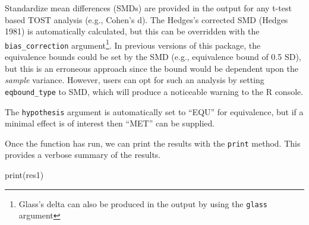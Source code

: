 \documentclass[
]{interact}
\newenvironment{Shaded}{\begin{snugshade}}{\end{snugshade}}
\newcommand{\AttributeTok}[1]{\textcolor[rgb]{0.40,0.45,0.13}{#1}}
\newcommand{\CommentTok}[1]{\textcolor[rgb]{0.37,0.37,0.37}{#1}}
\newcommand{\DecValTok}[1]{\textcolor[rgb]{0.68,0.00,0.00}{#1}}
\newcommand{\FunctionTok}[1]{\textcolor[rgb]{0.28,0.35,0.67}{#1}}
\newcommand{\NormalTok}[1]{\textcolor[rgb]{0.00,0.23,0.31}{#1}}
\newcommand{\OtherTok}[1]{\textcolor[rgb]{0.00,0.23,0.31}{#1}}
\newcommand{\SpecialCharTok}[1]{\textcolor[rgb]{0.37,0.37,0.37}{#1}}
\newcommand{\StringTok}[1]{\textcolor[rgb]{0.13,0.47,0.30}{#1}}
\begin{document}
Standardize mean differences (SMDs) are provided in the output for any
t-test based TOST analysis (e.g., Cohen's d). The Hedges's corrected SMD
(Hedges 1981) is automatically calculated, but this can be overridden
with the \texttt{bias\_correction} argument\footnote{Glass's delta can
  also be produced in the output by using the \texttt{glass} argument}.
In previous versions of this package, the equivalence bounds could be
set by the SMD (e.g., equivalence bound of 0.5 SD), but this is an
erroneous approach since the bound would be dependent upon the
\emph{sample} variance. However, users can opt for such an analysis by
setting \texttt{eqbound\_type} to SMD, which will produce a noticeable
warning to the R console.

The \texttt{hypothesis} argument is automatically set to ``EQU'' for
equivalence, but if a minimal effect is of interest then ``MET'' can be
supplied.

\begin{Shaded}
\end{Shaded}

Once the function has run, we can print the results with the
\texttt{print} method. This provides a verbose summary of the results.

\begin{Shaded}
\begin{Highlighting}[]
\FunctionTok{print}\NormalTok{(res1)}
\end{Highlighting}
\end{Shaded}
\end{document}
